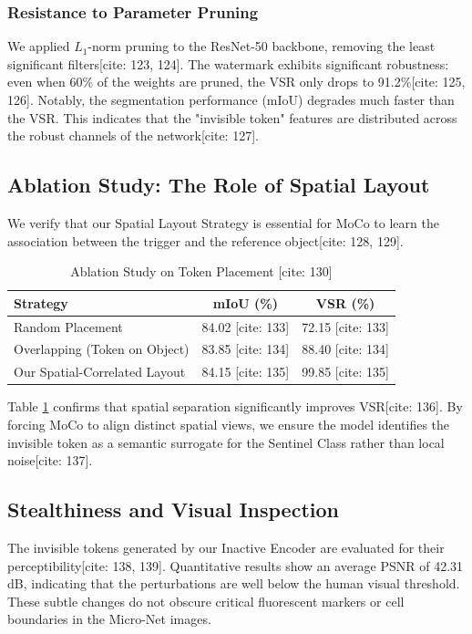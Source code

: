 \documentclass[10pt,twocolumn,letterpaper]{article}
\begin{document}
\subsubsection{Resistance to Parameter Pruning}
We applied $L_1$-norm pruning to the ResNet-50 backbone, removing the least significant filters[cite: 123, 124]. The watermark exhibits significant robustness: even when 60\% of the weights are pruned, the VSR only drops to 91.2\%[cite: 125, 126]. Notably, the segmentation performance (mIoU) degrades much faster than the VSR. This indicates that the "invisible token" features are distributed across the robust channels of the network[cite: 127].

\subsection{Ablation Study: The Role of Spatial Layout}
We verify that our Spatial Layout Strategy is essential for MoCo to learn the association between the trigger and the reference object[cite: 128, 129].

\begin{table}[h]
\centering
\caption{Ablation Study on Token Placement [cite: 130]}
\label{tab:ablation}
\begin{tabular}{lcc}
\toprule
Strategy & mIoU (\%) & VSR (\%) \\
\midrule
Random Placement & 84.02 [cite: 133] & 72.15 [cite: 133] \\
Overlapping (Token on Object) & 83.85 [cite: 134] & 88.40 [cite: 134] \\
Our Spatial-Correlated Layout & 84.15 [cite: 135] & 99.85 [cite: 135] \\
\bottomrule
\end{tabular}
\end{table}

Table \ref{tab:ablation} confirms that spatial separation significantly improves VSR[cite: 136]. By forcing MoCo to align distinct spatial views, we ensure the model identifies the invisible token as a semantic surrogate for the Sentinel Class rather than local noise[cite: 137].

\subsection{Stealthiness and Visual Inspection}
The invisible tokens generated by our Inactive Encoder are evaluated for their perceptibility[cite: 138, 139]. Quantitative results show an average PSNR of 42.31 dB, indicating that the perturbations are well below the human visual threshold. These subtle changes do not obscure critical fluorescent markers or cell boundaries in the Micro-Net images.
\end{document}
